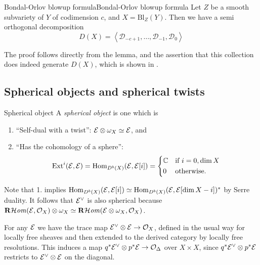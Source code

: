 \begin{theorem}[label=thm:blowupformula]{Bondal-Orlov blowup formula}{Bondal-Orlov blowup formula}
    Let $Z$ be a smooth subvariety of $Y$ of codimension $c$, and $X = \mathrm{Bl}_{Z}(Y)$. Then we have a semi orthogonal decomposition $$ D(X) = \left< \mathcal{D}_{-c+1},\dots,\mathcal{D}_{-1}, \mathcal{D}_0 \right> $$
\end{theorem}

The proof follows directly from the lemma, and the assertion that this collection does indeed generate $D(X)$, which is shown in \cite{orlov_projective_1993}.

\subsection{Spherical objects and spherical twists}

\begin{definition}{Spherical object}{}
    A \emph{spherical object} is one which is
    \begin{enumerate}
        \item ``Self-dual with a twist'': $\mathcal{E}\otimes\omega_X\simeq\mathcal{E}$, and
        \item ``Has the cohomology of a sphere'':
            \begin{equation*}
                \Ext^i(\calE,\calE)
                    = \Hom_{D^b(X)}(\calE,\calE[i])
                    = \begin{cases*}
                        \C & if $i=0,\dim X$ \\
                        0 & otherwise.
                    \end{cases*}
            \end{equation*}
    \end{enumerate}
\end{definition}

Note that 1. implies $\operatorname{Hom}_{D^b(X)}(\mathcal{E},\mathcal{E}[i])\simeq\operatorname{Hom}_{D^b(X)}(\mathcal{E},\mathcal{E}[\dim X-i])^*$
by Serre duality. It follows that $\mathcal{E}^\vee$ is also spherical because
$\operatorname{\mathbf{R}\mathcal{H}\mathit{om}}(\mathcal{E},\mathcal{O}_X)\otimes\omega_X\simeq\operatorname{\mathbf{R}\mathcal{H}\mathit{om}}(\mathcal{E}\otimes\omega_X,\mathcal{O}_X)$.

For any $\mathcal{E}$ we have the trace map $\mathcal{E}^\vee\otimes\mathcal{E}\to\mathcal{O}_X$, defined
in the usual way for locally free sheaves and then extended to the derived
category by locally free resolutions. This induces a map
$q^*\mathcal{E}^\vee\otimes p^*\mathcal{E}\to\mathcal{O}_\Delta$ over $X\times X$, since
$q^*\mathcal{E}^\vee\otimes p^*\mathcal{E}$ restricts to $\mathcal{E}^\vee\otimes\mathcal{E}$ on the
diagonal.

